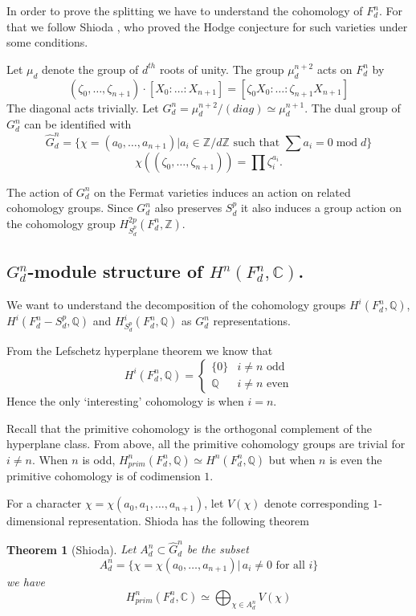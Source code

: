 \documentclass[12pt,reqno]{article}
\newtheorem{thm}[defn]{Theorem}
\newcommand {\ZZ}{{\mathds Z}}
\newcommand {\C}{{\mathds C}}
\newcommand {\Q}{{\mathds Q}}
\newcommand{\hG}{\hat{G}}
\def\mod{\operatorname{mod}}
\begin{document}
In order to prove the splitting we have to understand the cohomology of $F_d^n$. For that we follow Shioda \cite{shio}, who proved the Hodge conjecture for such varieties under some conditions. 

Let $\mu_d$ denote the group of $d^{th}$ roots of unity.  The group $\mu_d^{n+2}$ acts on $F_d^n$ by 
%
$$(\zeta_0,\dots,\zeta_{n+1})\cdot [X_0:\dots:X_{n+1}]=[\zeta_0X_0:\dots:\zeta_{n+1}X_{n+1}]$$
%
The diagonal acts trivially. Let $G_d^n=\mu_d^{n+2}/(diag)\simeq \mu_d^{n+1}$. The dual group of $G_d^n$  can be identified with 
%
$$\hG^n_d=\{\chi=(a_0,\dots,a_{n+1})|a_i \in \ZZ/d\ZZ \text{ such that } \sum a_i=0 \mod d\}$$ 
$$\chi((\zeta_0,\dots,\zeta_{n+1}))=\prod \zeta_i^{a_i}.$$

The action of $G^n_d$ on the Fermat varieties induces an action on related cohomology groups. Since $G^n_d$ also preserves $S_d^p$ it also induces a group action on the cohomology group $H^{2p}_{S_d^p}(F_d^n,\ZZ)$.

\subsection{$G_d^n$-module structure of $H^n(F_d^n,\C)$.}


We want to understand the decomposition of the cohomology groups $H^i(F^n_d,\Q)$, $H^i(F^n_d-S_d^p,\Q)$ and $H^i_{S_d^p}(F_d^n,\Q)$ as $G_d^n$ representations.


From the Lefschetz hyperplane theorem we know that 
%
$$H^i(F_d^n,\Q) = \begin{cases} \{0\} & i\neq n \text{ odd}\\
								\Q & i\neq n \text{ even} \end{cases}$$
Hence the only `interesting' cohomology is when $i=n$. 

Recall that the primitive cohomology is the orthogonal complement of the hyperplane class. From above, all the primitive cohomology groups are trivial for $i\neq n$. When $n$ is odd, $H^n_{prim}(F_d^n,\Q)\simeq H^n(F_d^n,\Q)$ but when $n$ is even the primitive cohomology is of codimension $1$. 


For a character $\chi=\chi(a_0,a_1,\dots,a_{n+1})$, let $V(\chi)$ denote corresponding  $1$-dimensional representation.  Shioda has the following theorem 
 
\begin{thm}[Shioda] Let $A_d^n \subset \hG_d^n$ be the subset 
	$$A_d^n=\{\chi=\chi(a_0,\dots,a_{n+1})|\, a_i \neq 0 \text{ for all } i\}$$
	we have 	
 $$H^n_{prim}(F_d^n,\C)\simeq \bigoplus_{\chi \in A^n_d} V(\chi)$$ 		
	
\label{shiodatheorem}
	\end{thm}
	
\end{document}
